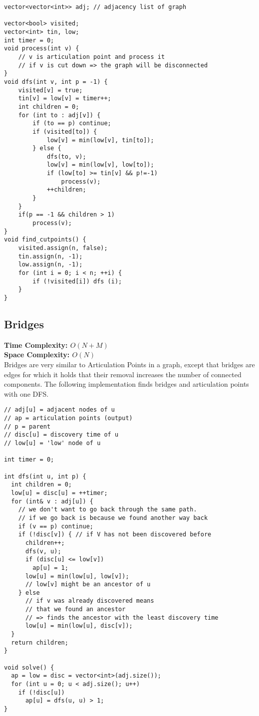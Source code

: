 \begin{lstlisting}
vector<vector<int>> adj; // adjacency list of graph

vector<bool> visited;
vector<int> tin, low;
int timer = 0;
void process(int v) {
    // v is articulation point and process it
    // if v is cut down => the graph will be disconnected
}
void dfs(int v, int p = -1) {
    visited[v] = true;
    tin[v] = low[v] = timer++;
    int children = 0;
    for (int to : adj[v]) {
        if (to == p) continue;
        if (visited[to]) {
            low[v] = min(low[v], tin[to]);
        } else {
            dfs(to, v);
            low[v] = min(low[v], low[to]);
            if (low[to] >= tin[v] && p!=-1)
                process(v);
            ++children;
        }
    }
    if(p == -1 && children > 1)
        process(v);
}
void find_cutpoints() {
    visited.assign(n, false);
    tin.assign(n, -1);
    low.assign(n, -1);
    for (int i = 0; i < n; ++i) {
        if (!visited[i]) dfs (i);
    }
}
\end{lstlisting}

\newpage

\subsection{Bridges}

\textbf{Time Complexity: $O(N + M)$}\\
\textbf{Space Complexity: $O(N)$}\\

Bridges are very similar to Articulation Points in a graph, except
that bridges are edges for which it holds that their removal increases the number
of connected components. The following implementation \cite{CutPointsCF}
finds bridges and articulation points with one DFS.
\\

\begin{lstlisting}
// adj[u] = adjacent nodes of u
// ap = articulation points (output)
// p = parent
// disc[u] = discovery time of u
// low[u] = 'low' node of u

int timer = 0;

int dfs(int u, int p) {
  int children = 0;
  low[u] = disc[u] = ++timer;
  for (int& v : adj[u]) {
    // we don't want to go back through the same path.
    // if we go back is because we found another way back
    if (v == p) continue;
    if (!disc[v]) { // if V has not been discovered before
      children++;
      dfs(v, u);
      if (disc[u] <= low[v])
        ap[u] = 1;
      low[u] = min(low[u], low[v]);
      // low[v] might be an ancestor of u
    } else
      // if v was already discovered means
      // that we found an ancestor
      // => finds the ancestor with the least discovery time
      low[u] = min(low[u], disc[v]);
  }
  return children;
}

void solve() {
  ap = low = disc = vector<int>(adj.size());
  for (int u = 0; u < adj.size(); u++)
    if (!disc[u])
      ap[u] = dfs(u, u) > 1;
}
\end{lstlisting}

